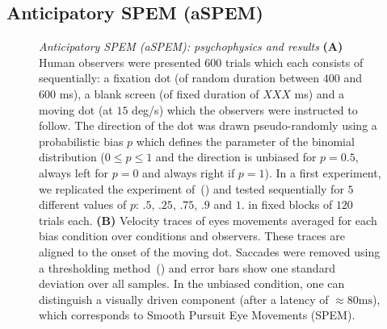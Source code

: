 \documentclass[profile,final,english, draft]{article}%
\newcommand{\ms}{\si{\milli\second}}%
\newcommand{\citep}[1]{(\cite{#1})}
\begin{document}
\subsection{Anticipatory SPEM (aSPEM)}
\begin{figure}%
\caption{\emph{Anticipatory SPEM (aSPEM): psychophysics and results} %
\textbf{(A)} Human observers were presented $600$ trials
which each consists of sequentially:
a fixation dot (of random duration between $400$ and $600$ \ms),
a blank screen (of fixed duration of  $XXX$ \ms) and
a moving dot (at $15$ deg/s) which the observers were instructed to follow.
The direction of the dot was drawn pseudo-randomly
using a probabilistic bias $p$ which defines the parameter
of the binomial distribution
($0\leq p\leq 1 $ and the direction is unbiased for $p=0.5$,
always left for $p=0$ and always right if $p=1$).
In a first experiment,
we replicated the experiment of~\citep{Montagnini2010} and
tested sequentially for $5$ different values of $p$: $.5$, $.25$, $.75$, $.9$ and $1.$ in fixed blocks of $120$ trials each.
\textbf{(B)}
Velocity traces of eyes movements averaged for each bias condition
over conditions and observers.
These traces are aligned to the onset of the moving dot.
Saccades were removed using a thresholding method~() and
error bars show one standard deviation over all samples.
In the unbiased condition, one can distinguish
a visually driven component (after a latency of $\approx 80 \ms$),
which corresponds to Smooth Pursuit Eye Movements (SPEM).
}
\end{figure}
\end{document}
